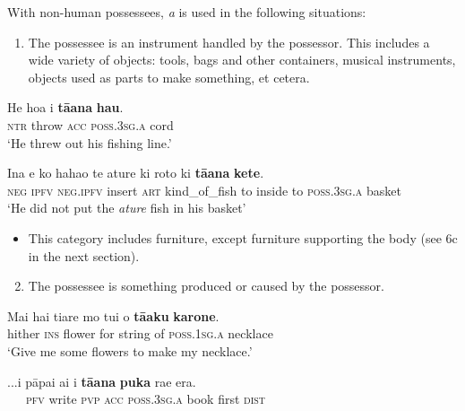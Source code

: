 With non-human possessees, \textit{{\ꞌ}a} is used in the following situations:

\begin{enumerate}
\item 
The possessee is an instrument handled by the possessor. This includes a wide variety of objects: tools, bags and other containers, musical instruments, objects used as parts to make something, et cetera.

\end{enumerate}

\ea\label{ex:6.69}
\gll He hoa i \textbf{tā{\ꞌ}ana} \textbf{hau}. \\
\textsc{ntr} throw \textsc{acc} \textsc{poss.3sg.a} cord \\

\glt 
‘He threw out his fishing line.’ \textstyleExampleref{[R338.024]} 
\z

\ea\label{ex:6.70}
\gll {\ꞌ}Ina e ko haha{\ꞌ}o te {\ꞌ}ature ki roto ki \textbf{tā{\ꞌ}ana} \textbf{kete}. \\
\textsc{neg} \textsc{ipfv} \textsc{neg.ipfv} insert \textsc{art} kind\_of\_fish to inside to \textsc{poss.3sg.a} basket \\

\glt
‘He did not put the \textit{ature} fish in his basket’ \textstyleExampleref{[Ley-5-27.011]}
\z
\begin{itemize}
\item[]
This category includes furniture, except furniture supporting the body (see 6c in the next section).
\end{itemize}

\begin{enumerate}
\setcounter{enumi}{1}
\item 
The possessee is something produced or caused by the possessor.

\end{enumerate}

\ea\label{ex:6.71}
\gll Mai hai tiare mo tui o \textbf{tā{\ꞌ}aku} \textbf{karone}. \\
hither \textsc{ins} flower for string of \textsc{poss.1sg.a} necklace \\

\glt 
‘Give me some flowers to make my necklace.’ \textstyleExampleref{[R175.006]} 
\z

\ea\label{ex:6.72}
\gll ...i pāpa{\ꞌ}i ai i \textbf{tā{\ꞌ}ana} \textbf{puka} ra{\ꞌ}e era.\\
~~~\textsc{pfv} write \textsc{pvp} \textsc{acc} \textsc{poss.3sg.a} book first \textsc{dist}\\

